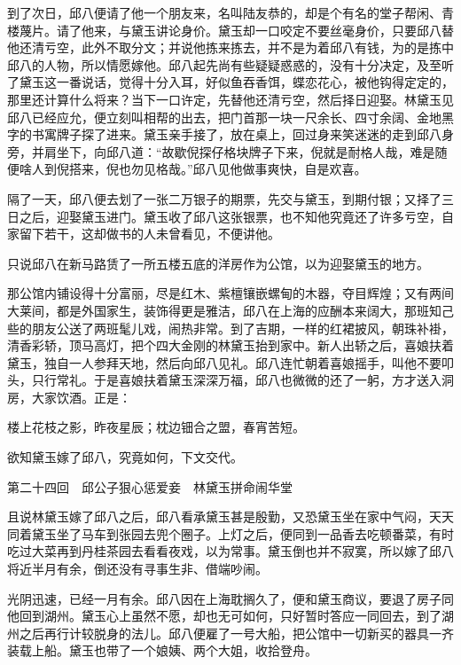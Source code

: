 \documentclass[12pt,UTF8]{ctexbook}
\begin{document}
{{{到了次日，邱八便请了他一个朋友来，名叫陆友恭的，却是个有名的堂子帮闲、青楼蔑片。请了他来，与黛玉讲论身价。黛玉却一口咬定不要丝毫身价，只要邱八替他还清亏空，此外不取分文；并说他拣来拣去，并不是为着邱八有钱，为的是拣中邱八的人物，所以情愿嫁他。邱八起先尚有些疑疑惑惑的，没有十分决定，及至听了黛玉这一番说话，觉得十分入耳，好似鱼吞香饵，蝶恋花心，被他钩得定定的，那里还计算什么将来？当下一口许定，先替他还清亏空，然后择日迎娶。林黛玉见邱八已经应允，便立刻叫相帮的出去，把门首那一块一尺余长、四寸余阔、金地黑字的书寓牌子探了进来。黛玉亲手接了，放在桌上，回过身来笑迷迷的走到邱八身旁，并肩坐下，向邱八道：“故歇倪探仔格块牌子下来，倪就是耐格人哉，难是随便啥人到倪搭来，倪也勿见格哉。”邱八见他做事爽快，自是欢喜。

隔了一天，邱八便去划了一张二万银子的期票，先交与黛玉，到期付银；又择了三日之后，迎娶黛玉进门。黛玉收了邱八这张银票，也不知他究竟还了许多亏空，自家留下若干，这却做书的人未曾看见，不便讲他。

只说邱八在新马路赁了一所五楼五底的洋房作为公馆，以为迎娶黛玉的地方。

那公馆内铺设得十分富丽，尽是红木、紫檀镶嵌螺甸的木器，夺目辉煌；又有两间大莱间，都是外国家生，装饰得更是雅洁，邱八在上海的应酬本来阔大，那班知己些的朋友公送了两班髦儿戏，闹热非常。到了吉期，一样的红裙披风，朝珠补褂，清香彩轿，顶马高灯，把个四大金刚的林黛玉抬到家中。新人出轿之后，喜娘扶着黛玉，独自一人参拜天地，然后向邱八见礼。邱八连忙朝着喜娘摇手，叫他不要叩头，只行常礼。于是喜娘扶着黛玉深深万福，邱八也微微的还了一躬，方才送入洞房，大家饮酒。正是：

楼上花枝之影，昨夜星辰；枕边钿合之盟，春宵苦短。

欲知黛玉嫁了邱八，究竟如何，下文交代。





第二十四回　邱公子狠心惩爱妾　林黛玉拼命闹华堂





且说林黛玉嫁了邱八之后，邱八看承黛玉甚是殷勤，又恐黛玉坐在家中气闷，天天同着黛玉坐了马车到张园去兜个圈子。上灯之后，便同到一品香去吃顿番菜，有时吃过大菜再到丹桂茶园去看看夜戏，以为常事。黛玉倒也并不寂寞，所以嫁了邱八将近半月有余，倒还没有寻事生非、借端吵闹。

光阴迅速，已经一月有余。邱八因在上海耽搁久了，便和黛玉商议，要退了房子同他回到湖州。黛玉心上虽然不愿，却也无可如何，只好暂时答应一同回去，到了湖州之后再行计较脱身的法儿。邱八便雇了一号大船，把公馆中一切新买的器具一齐装载上船。黛玉也带了一个娘姨、两个大姐，收拾登舟。

}}}
\end{document}
